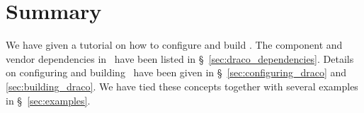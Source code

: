 
\section{Summary}

We have given a tutorial on how to configure and build \draco.  The
component and vendor dependencies in \draco\ have been listed in
\S~\ref{sec:draco_dependencies}.  Details on configuring and
building \draco\ have been given in \S~\ref{sec:configuring_draco} and 
\ref{sec:building_draco}.  We have tied these concepts together with
several examples in \S~\ref{sec:examples}.
